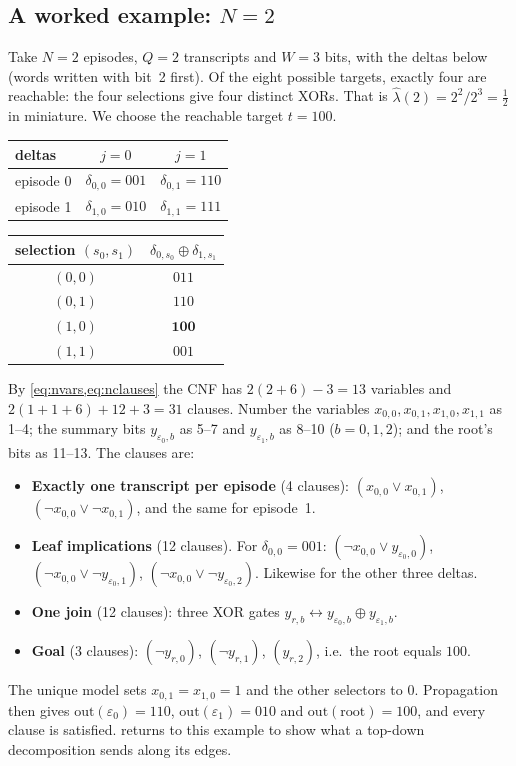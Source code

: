 \documentclass[11pt,a4paper]{article}
\newcommand{\outb}{\mathrm{out}}
\begin{document}
\subsection{A worked example: $N=2$}
\label{sec:example}
Take $N=2$ episodes, $Q=2$ transcripts and $W=3$ bits, with the deltas below (words written
with bit~2 first). Of the eight possible targets, exactly four are reachable: the four
selections give four distinct XORs. That is $\widehat{\lambda}(2)=2^2/2^3=\tfrac12$ in
miniature. We choose the reachable target $t=100$.
\begin{center}\small
\begin{tabular}{@{}lcc@{}}
\toprule
deltas & $j=0$ & $j=1$\\
\midrule
episode 0 & $\delta_{0,0}=001$ & $\delta_{0,1}=110$\\
episode 1 & $\delta_{1,0}=010$ & $\delta_{1,1}=111$\\
\bottomrule
\end{tabular}
\qquad
\begin{tabular}{@{}cc@{}}
\toprule
selection $(s_0,s_1)$ & $\delta_{0,s_0}\oplus\delta_{1,s_1}$\\
\midrule
$(0,0)$ & $011$\\ $(0,1)$ & $110$\\ $(1,0)$ & $\mathbf{100}$\\ $(1,1)$ & $001$\\
\bottomrule
\end{tabular}
\end{center}
By \cref{eq:nvars,eq:nclauses} the CNF has $2(2+6)-3=13$ variables and
$2(1+1+6)+12+3=31$ clauses. Number the variables
$x_{0,0},x_{0,1},x_{1,0},x_{1,1}$ as 1--4; the summary bits $y_{\varepsilon_0,b}$ as 5--7 and
$y_{\varepsilon_1,b}$ as 8--10 ($b=0,1,2$); and the root's bits as 11--13. The clauses are:
\begin{itemize}
\item \textbf{Exactly one transcript per episode} (4 clauses): $(x_{0,0}\lor x_{0,1})$,
      $(\neg x_{0,0}\lor\neg x_{0,1})$, and the same for episode~1.
\item \textbf{Leaf implications} (12 clauses). For $\delta_{0,0}=001$:
      $(\neg x_{0,0}\lor y_{\varepsilon_0,0})$, $(\neg x_{0,0}\lor\neg y_{\varepsilon_0,1})$,
      $(\neg x_{0,0}\lor\neg y_{\varepsilon_0,2})$. Likewise for the other three deltas.
\item \textbf{One join} (12 clauses): three XOR gates
      $y_{r,b}\leftrightarrow y_{\varepsilon_0,b}\oplus y_{\varepsilon_1,b}$.
\item \textbf{Goal} (3 clauses): $(\neg y_{r,0})$, $(\neg y_{r,1})$, $(y_{r,2})$, i.e.\
      the root equals $100$.
\end{itemize}
The unique model sets $x_{0,1}=x_{1,0}=1$ and the other selectors to 0. Propagation then gives
$\outb(\varepsilon_0)=110$, $\outb(\varepsilon_1)=010$ and $\outb(\text{root})=100$, and every
clause is satisfied. \Cref{sec:topdown} returns to this example to show what a top-down
decomposition sends along its edges.
\end{document}
